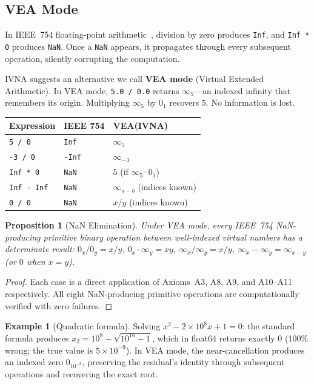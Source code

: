 \documentclass[12pt]{article}
\newtheorem{proposition}[theorem]{Proposition}
\theoremstyle{definition}
\newtheorem{example}[theorem]{Example}
\theoremstyle{remark}
\newcommand{\vz}[1]{0_{#1}}             %
\newcommand{\vi}[1]{\infty_{#1}}        %
\begin{document}
\subsection{VEA Mode}

In IEEE~754 floating-point arithmetic~\cite{ieee754}, division by zero
produces \texttt{Inf}, and \texttt{Inf * 0} produces \texttt{NaN}. Once
a \texttt{NaN} appears, it propagates through every subsequent operation,
silently corrupting the computation.

IVNA suggests an alternative we call \textbf{VEA mode} (Virtual Extended
Arithmetic). In VEA mode, \texttt{5.0 / 0.0} returns $\vi{5}$---an
indexed infinity that remembers its origin. Multiplying $\vi{5}$ by
$\vz{1}$ recovers $5$. No information is lost.

\begin{center}
\begin{tabular}{lll}
\toprule
\textbf{Expression} & \textbf{IEEE 754} & \textbf{VEA(IVNA)} \\
\midrule
\texttt{5 / 0}      & \texttt{Inf}  & $\vi{5}$ \\
\texttt{-3 / 0}     & \texttt{-Inf} & $\vi{-3}$ \\
\texttt{Inf * 0}    & \texttt{NaN}  & $5$ (if $\vi{5} \cdot \vz{1}$) \\
\texttt{Inf - Inf}  & \texttt{NaN}  & $\vi{a-b}$ (indices known) \\
\texttt{0 / 0}      & \texttt{NaN}  & $x/y$ (indices known) \\
\bottomrule
\end{tabular}
\end{center}

\begin{proposition}[NaN Elimination]
\label{prop:nan}
Under VEA mode, every IEEE~754 NaN-producing primitive binary operation
between well-indexed virtual numbers has a determinate result:
$\vz{x}/\vz{y} = x/y$,\quad
$\vz{x} \cdot \vi{y} = xy$,\quad
$\vi{x}/\vi{y} = x/y$,\quad
$\vi{x} - \vi{y} = \vi{x-y}$ (or $0$ when $x = y$).
\end{proposition}

\begin{proof}
Each case is a direct application of Axioms~A3, A8, A9, and A10--A11
respectively. All eight NaN-producing primitive operations are
computationally verified with zero failures.
\end{proof}

\begin{example}[Quadratic formula]
Solving $x^2 - 2 \times 10^8 x + 1 = 0$: the standard formula
produces $x_2 = 10^8 - \sqrt{10^{16} - 1}$, which in float64
returns exactly $0$ (100\% wrong; the true value is $5 \times 10^{-9}$).
In VEA mode, the near-cancellation produces an indexed zero
$\vz{10^{-8}}$, preserving the residual's identity through subsequent
operations and recovering the exact root.
\end{example}
\end{document}
